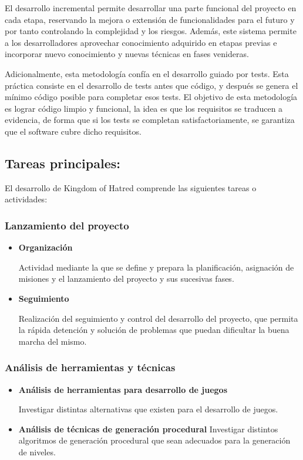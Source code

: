 			El desarrollo incremental permite desarrollar una parte funcional del proyecto en cada etapa, reservando la mejora o extensión de funcionalidades para el futuro y por tanto controlando la complejidad y los riesgos. Además, este sistema permite a los desarrolladores aprovechar conocimiento adquirido en etapas previas e incorporar nuevo conocimiento y nuevas técnicas en fases venideras.

			Adicionalmente, esta metodología confía en el desarrollo guiado por tests. Esta práctica consiste en el desarrollo de tests antes que código, y después se genera el mínimo código posible para completar esos tests. El objetivo de esta metodología es lograr código limpio y funcional, la idea es que los requisitos se traducen a evidencia, de forma que si los tests se completan satisfactoriamente, se garantiza que el software cubre dicho requisitos.

		\subsection{Tareas principales:}

			El desarrollo de Kingdom of Hatred comprende las siguientes tareas o actividades:

			\subsubsection{Lanzamiento del proyecto}

			\begin{itemize}
				\item \textbf{Organización}

				Actividad mediante la que se define y prepara la planificación, asignación de misiones y el lanzamiento del proyecto y sus sucesivas fases.
				\item \textbf{Seguimiento}

				Realización del seguimiento y control del desarrollo del proyecto, que permita la rápida detención y solución de problemas que puedan dificultar la buena marcha del mismo.
			\end{itemize}

			\subsubsection{Análisis de herramientas y técnicas}

			\begin{itemize}
				\item \textbf{Análisis de herramientas para desarrollo de juegos}
				
				Investigar distintas alternativas que existen para el desarrollo de juegos.

				\item \textbf{Análisis de técnicas de generación procedural}
				Investigar distintos algoritmos de generación procedural que sean adecuados para la generación de niveles.
			\end{itemize}


